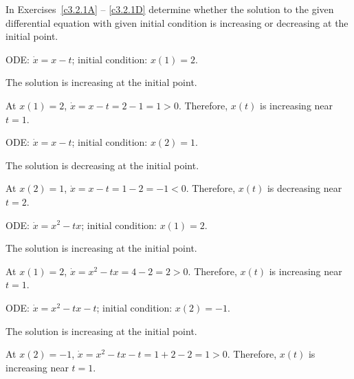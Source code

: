 \documentclass{ximera}
\begin{document}
\TEXER

\noindent In Exercises~\ref{c3.2.1A} -- \ref{c3.2.1D} determine whether the 
solution to the given differential equation with given initial condition is 
increasing or decreasing at the initial point.
\begin{exercise} \label{c3.2.1A}
ODE: $\dot{x}=x-t$; initial condition: $x(1)=2$.

\begin{solution}
\ans The solution is increasing at the initial point.

\soln At $x(1)=2$, $\dot{x}=x-t=2-1=1>0$.  Therefore, $x(t)$ is increasing
near $t=1$.

\end{solution}
\end{exercise}
\begin{exercise} \label{c3.2.1B}
ODE: $\dot{x}=x-t$; initial condition: $x(2)=1$.

\begin{solution}
\ans The solution is decreasing at the initial point.

\soln At $x(2)=1$, $\dot{x}=x-t=1-2=-1<0$.  Therefore, $x(t)$ is decreasing
near $t=2$.

\end{solution}
\end{exercise}
\begin{exercise} \label{c3.2.1C}
ODE: $\dot{x}=x^2-tx$; initial condition: $x(1)=2$.

\begin{solution}
\ans The solution is increasing at the initial point.

\soln At $x(1)=2$, $\dot{x}=x^2-tx=4-2=2>0$.  Therefore, $x(t)$ is increasing
near $t=1$.

\end{solution}
\end{exercise}
\begin{exercise} \label{c3.2.1D}
ODE: $\dot{x}=x^2-tx-t$; initial condition: $x(2)=-1$.

\begin{solution}
\ans The solution is increasing at the initial point.

\soln At $x(2)=-1$, $\dot{x}=x^2-tx-t=1+2-2=1>0$.  Therefore, $x(t)$ is
increasing near $t=1$.

\end{solution}
\end{exercise}
\end{document}
